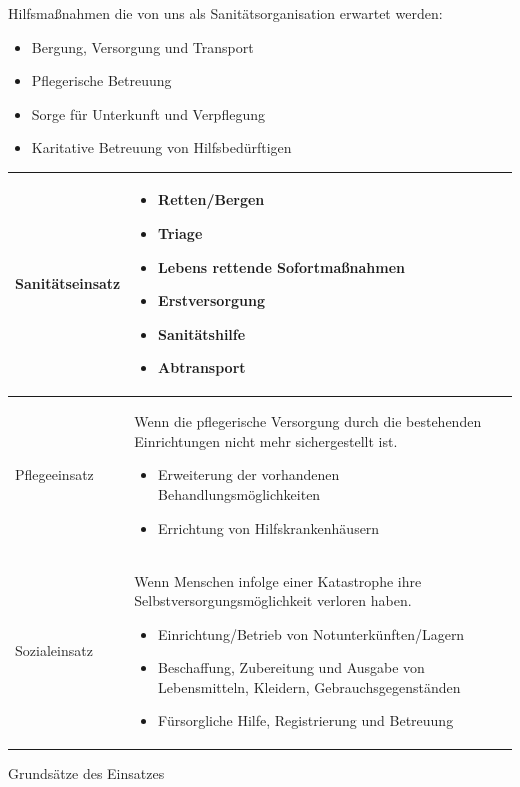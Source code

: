\documentclass{article}
\begin{document}
Hilfsma{\ss}nahmen die von uns als Sanit\"atsorganisation erwartet
werden:

\begin{itemize}
\item Bergung, Versorgung und Transport 

\item Pflegerische Betreuung 

\item Sorge f\"ur Unterkunft und Verpflegung 

\item Karitative Betreuung von Hilfsbed\"urftigen

\end{itemize}
\begin{center}
\tablehead{}\begin{supertabular}{|m{6.649cm}|m{6.651cm}|}
\hline
Sanit\"atseinsatz

 &
\begin{itemize}
\item Retten/Bergen

\item Triage

\item Lebens rettende Sofortma{\ss}nahmen

\item Erstversorgung

\item Sanit\"atshilfe

\item Abtransport

\end{itemize}
\\\hline
Pflegeeinsatz

 &
Wenn die pflegerische Versorgung durch die bestehenden Einrichtungen
nicht mehr sichergestellt ist.

\begin{itemize}
\item Erweiterung der vorhandenen Behandlungsm\"oglichkeiten

\item Errichtung von Hilfskrankenh\"ausern

\end{itemize}
\\\hline
Sozialeinsatz

 &
Wenn Menschen infolge einer Katastrophe ihre
Selbstversorgungsm\"oglichkeit verloren haben.

\begin{itemize}
\item Einrichtung/Betrieb von Notunterk\"unften/Lagern  

\item Beschaffung, Zubereitung und Ausgabe von Lebensmitteln, Kleidern,
Gebrauchsgegenst\"anden  

\item F\"ursorgliche Hilfe, Registrierung und Betreuung

\end{itemize}
\\\hline
\end{supertabular}
\end{center}
Grunds\"atze des Einsatzes
\end{document}
